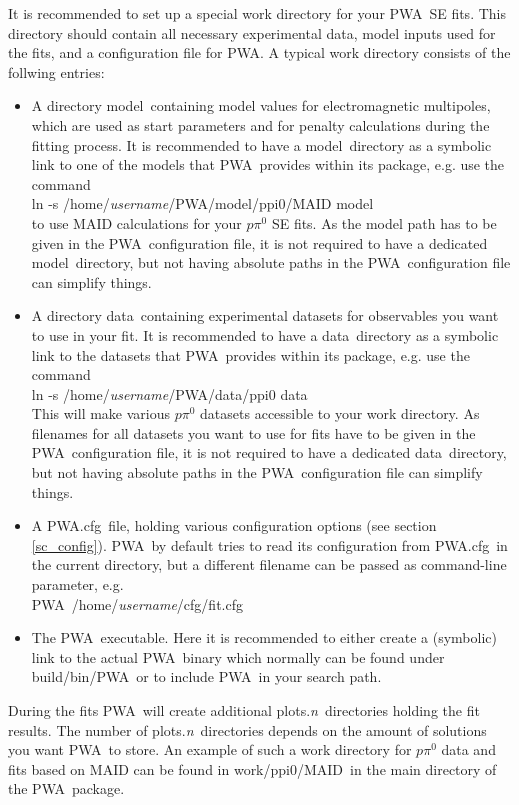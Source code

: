 \documentclass[a4paper,10pt]{article}
\def\PWA{\ttfamily PWA\rmfamily\ }
\def\tt{\ttfamily}
\def\rm{\rmfamily}
\begin{document}
It is recommended to set up a special work directory for your \PWA SE fits. This directory should contain
all necessary experimental data, model inputs used for the fits, and a configuration file for \tt PWA\rm.
A typical work directory consists of the follwing entries:
\begin{itemize}
\item A directory \tt model\rm\ containing model values for electromagnetic multipoles, which are used
as start parameters and for penalty calculations during the fitting process.
It is recommended to have a \tt model\rm\ directory as a symbolic link to one of the models that \PWA provides within 
its package, e.g. use the command\\
\tt ln -s /home/\textit{username}/PWA/model/ppi0/MAID model\rm\\
to use MAID calculations for your $p \pi^0$ SE fits. 
As the model path has to be given in the \PWA configuration file, it is not required to have a dedicated \tt model\rm\ directory, but
not having absolute paths in the \PWA configuration file can simplify things.

\item A directory \tt data\rm\ containing experimental datasets for observables you want to use in your fit.
It is recommended to have a \tt data\rm\ directory as a symbolic link to the datasets that \PWA provides within 
its package, e.g. use the command\\
\tt ln -s /home/\textit{username}/PWA/data/ppi0 data\rm\\
This will make various $p\pi^0$ datasets accessible to your work directory. As filenames for all datasets you want to use for fits
have to be given in the \PWA configuration file, it is not required to have a dedicated \tt data\rm\ directory, but
not having absolute paths in the \PWA configuration file can simplify things.

\item A \tt PWA.cfg\rm\ file, holding various configuration options (see section \ref{sc_config}).
\PWA by default tries to read its configuration from \tt PWA.cfg\rm\ in the current directory, but a different filename
can be passed as command-line parameter, e.g.\\
\PWA \tt /home/\textit{username}/cfg/fit.cfg\rm

\item The \PWA executable. Here it is recommended to either create a (symbolic) link to the actual \PWA binary
which normally can be found under \tt build/bin/PWA\rm\ or to include \PWA  in your search path.
\end{itemize}
During the fits \PWA will create additional \tt plots.\textit{n}\rm\ directories holding the fit results.
The number of \tt plots.\textit{n}\rm\ directories depends on the amount of solutions you want \PWA to store.
An example of such a work directory for $p \pi^0$ data and fits based on MAID can be found in
\tt work/ppi0/MAID\rm\ in the main directory of the \PWA package.
\end{document}

